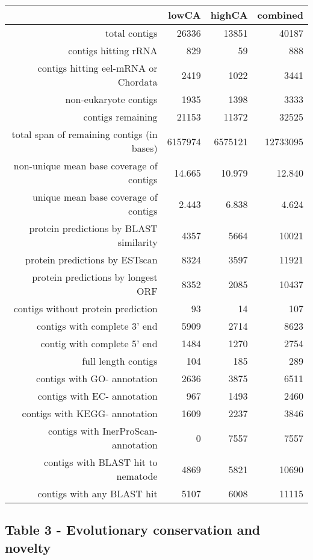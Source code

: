 \documentclass[10pt]{bmc_article}
\newenvironment{bmcformat}{\begin{raggedright}\baselineskip20pt\sloppy\setboolean{publ}{false}}{\end{raggedright}\baselineskip20pt\sloppy}
\begin{document}
\begin{bmcformat}
\begin{table}[ht]
\begin{center}
\begin{tabular}{rrrr}
  \hline
 & lowCA & highCA & combined \\ 
  \hline
total contigs & 26336 & 13851 & 40187 \\ 
  contigs hitting rRNA & 829 & 59 & 888 \\ 
  contigs hitting eel-mRNA or Chordata & 2419 & 1022 & 3441 \\ 
  non-eukaryote contigs & 1935 & 1398 & 3333 \\ 
  contigs remaining & 21153 & 11372 & 32525 \\ 
  total span of remaining contigs (in bases) & 6157974 & 6575121 & 12733095 \\ 
  non-unique mean base coverage of contigs & 14.665 & 10.979 & 12.840 \\ 
  unique mean base coverage of contigs & 2.443 & 6.838 & 4.624 \\ 
  protein predictions by BLAST similarity & 4357 & 5664 & 10021 \\ 
  protein predictions by ESTscan & 8324 & 3597 & 11921 \\ 
  protein predictions by longest ORF & 8352 & 2085 & 10437 \\ 
  contigs without protein prediction & 93 & 14 & 107 \\ 
  contigs with complete 3' end & 5909 & 2714 & 8623 \\ 
  contig with complete 5' end & 1484 & 1270 & 2754 \\ 
  full length contigs & 104 & 185 & 289 \\ 
  contigs with GO- annotation & 2636 & 3875 & 6511 \\ 
  contigs with EC- annotation & 967 & 1493 & 2460 \\ 
  contigs with KEGG- annotation & 1609 & 2237 & 3846 \\ 
  contigs with InerProScan- annotation & 0 & 7557 & 7557 \\ 
  contigs with BLAST hit to nematode & 4869 & 5821 & 10690 \\ 
  contigs with any BLAST hit & 5107 & 6008 & 11115 \\ 
   \hline
\end{tabular}
\end{center}
\end{table}
\subsection*{Table 3 - Evolutionary conservation and novelty}


\end{bmcformat}
\end{document}
